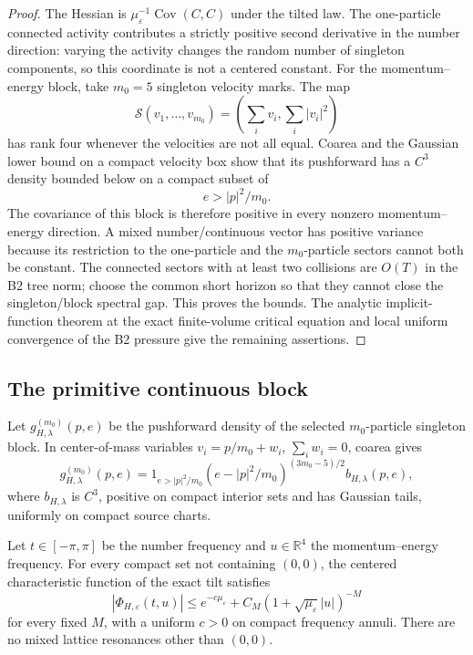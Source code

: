 \begin{proof}
The Hessian is
\(\mu_\varepsilon^{-1}\operatorname{Cov}(C,C)\) under the tilted law.
The one-particle connected activity contributes a strictly positive second
derivative in the number direction: varying the activity changes the random
number of singleton components, so this coordinate is not a centered
constant.  For the momentum--energy block, take \(m_0=5\) singleton velocity
marks.  The map
\[
 \mathcal S(v_1,\ldots,v_{m_0})=
 \left(\sum_iv_i,\sum_i|v_i|^2\right)
\]
has rank four whenever the velocities are not all equal.  Coarea and the
Gaussian lower bound on a compact velocity box show that its pushforward has
a \(C^3\) density bounded below on a compact subset of
\[
 e>|p|^2/m_0.
\]
The covariance of this block is therefore positive in every nonzero
momentum--energy direction.  A mixed number/continuous vector has positive
variance because its restriction to the one-particle and the \(m_0\)-particle
sectors cannot both be constant.  The connected sectors with at least two
collisions are \(O(T)\) in the B2 tree norm; choose the common short horizon so
that they cannot close the singleton/block spectral gap.  This proves the
bounds.  The analytic implicit-function theorem at the exact finite-volume
critical equation and local uniform convergence of the B2 pressure give the
remaining assertions.
\end{proof}

\subsection{The primitive continuous block}

Let \(g_{H,\lambda}^{(m_0)}(p,e)\) be the pushforward density of the selected
\(m_0\)-particle singleton block.  In center-of-mass variables
\(v_i=p/m_0+w_i\), \(\sum_iw_i=0\), coarea gives
\[
 g_{H,\lambda}^{(m_0)}(p,e)=
 1_{e>|p|^2/m_0}
 \left(e-|p|^2/m_0\right)^{(3m_0-5)/2}
 b_{H,\lambda}(p,e),
\]
where \(b_{H,\lambda}\) is \(C^3\), positive on compact interior sets and has
Gaussian tails, uniformly on compact source charts.

\begin{lemma}
\label{lem:r5-b1-cramer}
Let \(t\in[-\pi,\pi]\) be the number frequency and
\(u\in\mathbb R^4\) the momentum--energy frequency.  For every compact set
not containing \((0,0)\), the centered characteristic function of the exact
tilt satisfies
\[
 |\Phi_{H,\varepsilon}(t,u)|
 \le e^{-c\mu_\varepsilon}
 +C_M(1+\sqrt{\mu_\varepsilon}|u|)^{-M}
\]
for every fixed \(M\), with a uniform \(c>0\) on compact frequency annuli.
There are no mixed lattice resonances other than \((0,0)\).
\end{lemma}

